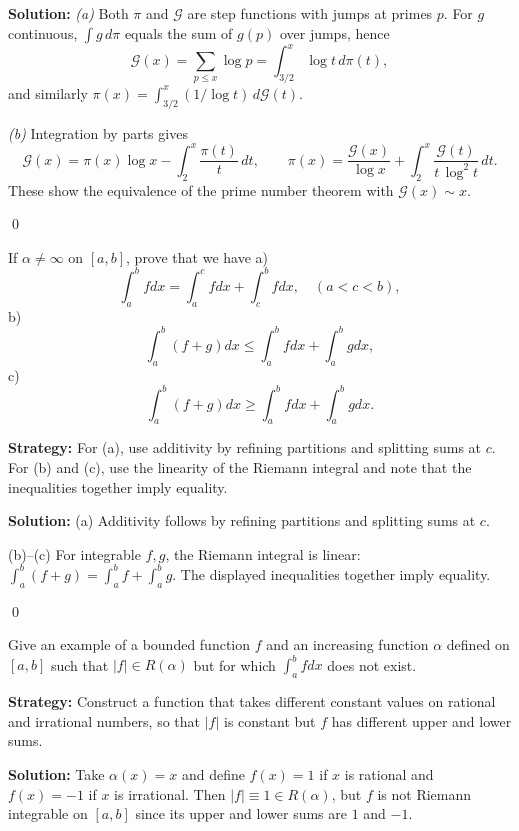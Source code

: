 \bigskip\noindent\textbf{Solution:}
\textit{(a)} Both $\pi$ and $\mathcal{G}$ are step functions with jumps at primes $p$. For $g$ continuous, $\int g\,d\pi$ equals the sum of $g(p)$ over jumps, hence
\[\mathcal{G}(x)=\sum_{p\le x}\log p=\int_{3/2}^{x} \log t\,d\pi(t),\]
and similarly $\pi(x)=\int_{3/2}^{x} (1/\log t)\,d\mathcal{G}(t)$.

\textit{(b)} Integration by parts gives
\[\mathcal{G}(x)=\pi(x)\log x-\int_2^x \frac{\pi(t)}{t}\,dt,\qquad \pi(x)=\frac{\mathcal{G}(x)}{\log x}+\int_2^x \frac{\mathcal{G}(t)}{t\,\log^2 t}\,dt.
\]
These show the equivalence of the prime number theorem with $\mathcal{G}(x)\sim x$.




\qed
\begin{problembox}
If $\alpha \neq \infty$ on $[a, b]$, prove that we have
a) \[\int_{a}^{b} f dx = \int_{a}^{c} f dx + \int_{c}^{b} f dx, \quad (a < c < b),\]
b) \[\int_{a}^{b} (f + g) dx \leq \int_{a}^{b} f dx + \int_{a}^{b} g dx,\]
c) \[\int_{a}^{b} (f + g) dx \geq \int_{a}^{b} f dx + \int_{a}^{b} g dx.\]
\end{problembox}

\noindent\textbf{Strategy:} For (a), use additivity by refining partitions and splitting sums at $c$. For (b) and (c), use the linearity of the Riemann integral and note that the inequalities together imply equality.

\bigskip\noindent\textbf{Solution:}
(a) Additivity follows by refining partitions and splitting sums at $c$.

(b)–(c) For integrable $f,g$, the Riemann integral is linear: $\int_a^b(f+g)=\int_a^b f+\int_a^b g$. The displayed inequalities together imply equality.




\qed
\begin{problembox}
Give an example of a bounded function $f$ and an increasing function $\alpha$ defined on $[a, b]$ such that $|f| \in R(\alpha)$ but for which $\int_{a}^{b} f dx$ does not exist.
\end{problembox}

\noindent\textbf{Strategy:} Construct a function that takes different constant values on rational and irrational numbers, so that $|f|$ is constant but $f$ has different upper and lower sums.

\bigskip\noindent\textbf{Solution:}
Take $\alpha(x)=x$ and define $f(x)=1$ if $x$ is rational and $f(x)=-1$ if $x$ is irrational. Then $|f|\equiv 1\in R(\alpha)$, but $f$ is not Riemann integrable on $[a,b]$ since its upper and lower sums are $1$ and $-1$.




